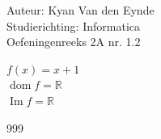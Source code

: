 \documentclass[a4paper]{article}
\begin{document}
  
\noindent \large Auteur: Kyan Van den Eynde \\
\noindent \large Studierichting: Informatica\\
\noindent \large Oefeningenreeks 2A nr. 1.2\\

\medskip

\normalsize

$f(x) = x+1$\\

$\operatorname{dom}f = \mathbb{R}$\\

$\operatorname{Im}f = \mathbb{R}$\\

\begin{thebibliography}{999}
\end{thebibliography}
\end{document}
